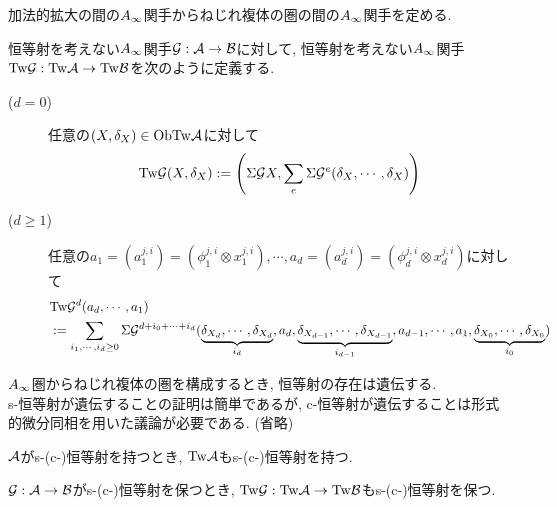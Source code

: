 \documentclass[aspectratio=169, dvipdfmx, 8pt, notheorems, uplatex]{beamer}
\begin{document}
\begin{frame}
  加法的拡大の間の$A_\infty$関手からねじれ複体の圏の間の$A_\infty$関手を定める. 

  \begin{definition}
    恒等射を考えない$A_\infty$関手$\mathcal{G} : \mathcal{A} \to \mathcal{B}$に対して, 恒等射を考えない$A_\infty$関手$\mathrm{Tw}\mathcal{G} : \mathrm{Tw}\mathcal{A} \to \mathrm{Tw}\mathcal{B}$を次のように定義する. 
    \begin{description}
      \item[($d=0$)] 任意の$(X,\delta_X) \in \mathrm{Ob}\mathrm{Tw}\mathcal{A}$に対して
      \begin{align*}
        \mathrm{Tw}\mathcal{G} (X,\delta_X) 
        := \qty(\Sigma\mathcal{G} X, \sum_{e} \Sigma\mathcal{G}^e(\delta_X,\cdots,\delta_X))
      \end{align*}
      \item[($d \geq 1$)] 任意の$a_1 = (a_1^{j,i}) = (\phi_1^{j,i} \otimes x_1^{j,i}), \cdots, a_d = (a_d^{j,i}) = (\phi_d^{j,i} \otimes x_d^{j,i})$に対して
      \begin{align*}
        &\mathrm{Tw}\mathcal{G}^d (a_d,\cdots,a_1) \\
        &:= \sum_{i_1,\cdots,i_d \geq 0} \Sigma\mathcal{G}^{d+i_0+\cdots+i_d} (
          \underbrace{\delta_{X_d},\cdots,\delta_{X_d}}_{i_d}, a_d, 
          \underbrace{\delta_{X_{d-1}},\cdots,\delta_{X_{d-1}}}_{i_{d-1}}, a_{d-1}, 
          \cdots, a_1, 
          \underbrace{\delta_{X_0},\cdots,\delta_{X_0}}_{i_0})
      \end{align*}
    \end{description}
  \end{definition}
\end{frame}

\begin{frame}
  $A_\infty$圏からねじれ複体の圏を構成するとき, 恒等射の存在は遺伝する. \\
  s-恒等射が遺伝することの証明は簡単であるが, c-恒等射が遺伝することは形式的微分同相を用いた議論が必要である. (省略)

  \begin{lemma} \label{prop_TwA_is_also_unital}
    $\mathcal{A}$がs-(c-)恒等射を持つとき, $\mathrm{Tw}\mathcal{A}$もs-(c-)恒等射を持つ.
  \end{lemma} 

  \begin{theorem} \label{prop_TwG_is_also_c_unital}
    $\mathcal{G} : \mathcal{A} \to \mathcal{B}$がs-(c-)恒等射を保つとき, $\mathrm{Tw}\mathcal{G} : \mathrm{Tw}\mathcal{A} \to \mathrm{Tw}\mathcal{B}$もs-(c-)恒等射を保つ.
  \end{theorem}
\end{frame}
\end{document}
